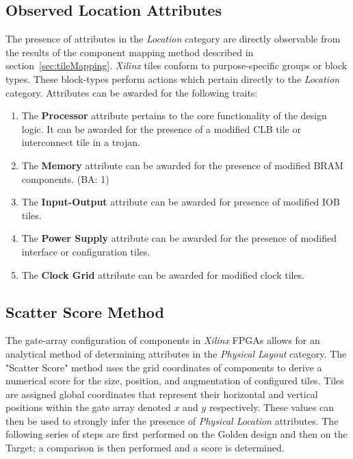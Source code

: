 \documentclass[journal, hidelinks]{IEEEtran}
\begin{document}
\subsection{Observed Location Attributes}
The presence of attributes in the \textit{Location} category are directly observable from the results of the component mapping method described in section~\ref{sec:tileMapping}.
\textit{Xilinx} tiles conform to purpose-specific groups or block types.
These block-types perform actions which pertain directly to the \textit{Location} category.
Attributes can be awarded for the following traits: 
\begin{enumerate}
	\item The \textbf{Processor} attribute pertains to the core functionality of the design logic. It can be awarded for the presence of a modified CLB tile or interconnect tile in a trojan.
	\item The \textbf{Memory} attribute can be awarded for the presence of modified BRAM components. (BA: 1)
	\item The \textbf{Input-Output} attribute can be awarded for presence of modified IOB tiles.
	\item The \textbf{Power Supply} attribute can be awarded for the presence of modified interface or configuration tiles.
	\item The \textbf{Clock Grid} attribute can be awarded for modified clock tiles.
\end{enumerate}

\subsection{Scatter Score Method} \label{sec:scatterScore}
The gate-array configuration of components in \textit{Xilinx} FPGAs allows for an analytical method of determining attributes in the \textit{Physical Layout} category.
The "Scatter Score" method uses the grid coordinates of components to derive a numerical score for the size, position, and augmentation of configured tiles.
Tiles are assigned global coordinates that represent their horizontal and vertical positions within the gate array denoted $x$ and $y$ respectively. 
These values can then be used to strongly infer the presence of \textit{Physical Location} attributes.
The following series of steps are first performed on the Golden design and then on the Target; a comparison is then performed and a score is determined.
\end{document}
